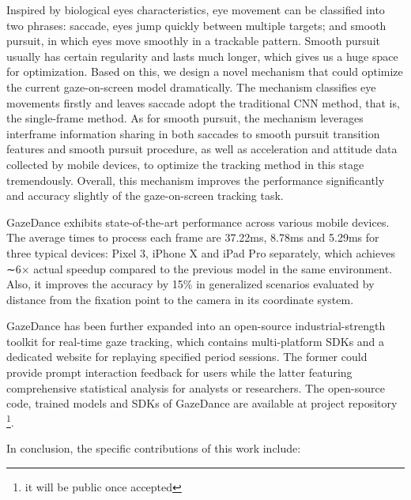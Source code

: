 \documentclass[acmlarge]{acmart}
\begin{document}
Inspired by biological eyes characteristics, eye movement can be classified into two phrases: saccade, eyes jump quickly between multiple targets; and smooth pursuit, in which eyes move smoothly in a trackable pattern. Smooth pursuit usually has certain regularity and lasts much longer, which gives us a huge space for optimization. Based on this, we design a novel mechanism that could optimize the current gaze-on-screen model dramatically. The mechanism classifies eye movements firstly and leaves saccade adopt the traditional CNN method, that is, the single-frame method. As for smooth pursuit, the mechanism leverages interframe information sharing in both saccades to smooth pursuit transition features and smooth pursuit procedure, as well as acceleration and attitude data collected by mobile devices, to optimize the tracking method in this stage tremendously. Overall, this mechanism improves the performance significantly and accuracy slightly of the gaze-on-screen tracking task. 

GazeDance exhibits state-of-the-art performance across various mobile devices. The average times to process each frame are 37.22ms, 8.78ms and 5.29ms for three typical devices: Pixel 3, iPhone X and iPad Pro separately, which achieves ∼6× actual speedup compared to the previous model in the same environment. Also, it improves the accuracy by 15\% in generalized scenarios evaluated by distance from the fixation point to the camera in its coordinate system.

GazeDance has been further expanded into an open-source industrial-strength toolkit for real-time gaze tracking, which contains multi-platform SDKs and a dedicated website for replaying specified period sessions. The former could provide prompt interaction feedback for users while the latter featuring comprehensive statistical analysis for analysts or researchers. The open-source code, trained models and SDKs of GazeDance are available at project repository \footnote{it will be public once accepted}.

In conclusion, the specific contributions of this work include:
\end{document}
